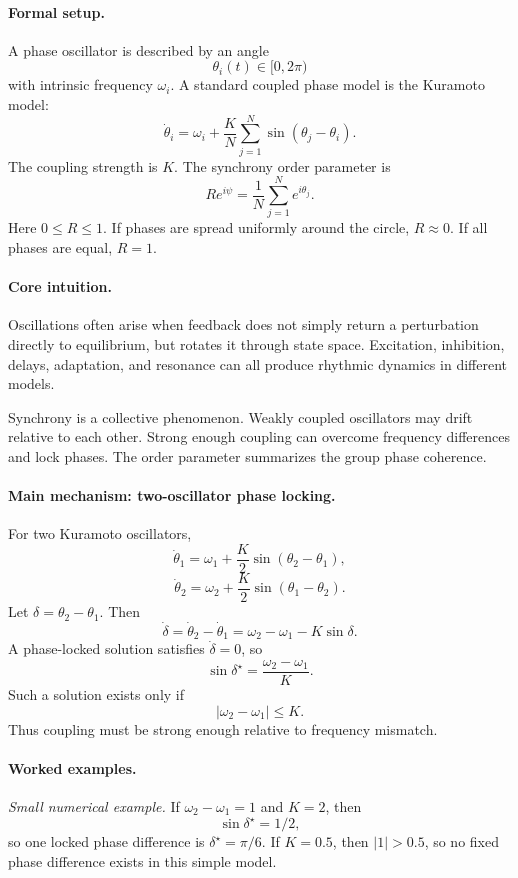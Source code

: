 \paragraph{Formal setup.}
A phase oscillator is described by an angle
\[
\theta_i(t)\in[0,2\pi)
\]
with intrinsic frequency \(\omega_i\). A standard coupled phase model is the Kuramoto model:
\[
\boxed{
\dot\theta_i=\omega_i+\frac{K}{N}\sum_{j=1}^N\sin(\theta_j-\theta_i).
}
\]
The coupling strength is \(K\). The synchrony order parameter is
\[
\boxed{
Re^{i\psi}=\frac1N\sum_{j=1}^N e^{i\theta_j}.
}
\]
Here \(0\leq R\leq1\). If phases are spread uniformly around the circle, \(R\approx0\). If all phases are equal, \(R=1\).

\paragraph{Core intuition.}
Oscillations often arise when feedback does not simply return a perturbation directly to equilibrium, but rotates it through state space. Excitation, inhibition, delays, adaptation, and resonance can all produce rhythmic dynamics in different models.

Synchrony is a collective phenomenon. Weakly coupled oscillators may drift relative to each other. Strong enough coupling can overcome frequency differences and lock phases. The order parameter summarizes the group phase coherence.

\paragraph{Main mechanism: two-oscillator phase locking.}
For two Kuramoto oscillators,
\[
\dot\theta_1=\omega_1+\frac K2\sin(\theta_2-\theta_1),
\]
\[
\dot\theta_2=\omega_2+\frac K2\sin(\theta_1-\theta_2).
\]
Let \(\delta=\theta_2-\theta_1\). Then
\[
\dot\delta
=\dot\theta_2-\dot\theta_1
=\omega_2-\omega_1-K\sin\delta.
\]
A phase-locked solution satisfies \(\dot\delta=0\), so
\[
\boxed{
\sin\delta^\star=\frac{\omega_2-\omega_1}{K}.
}
\]
Such a solution exists only if
\[
|\omega_2-\omega_1|\leq K.
\]
Thus coupling must be strong enough relative to frequency mismatch.

\paragraph{Worked examples.}
\emph{Small numerical example.}
If \(\omega_2-\omega_1=1\) and \(K=2\), then
\[
\sin\delta^\star=1/2,
\]
so one locked phase difference is \(\delta^\star=\pi/6\). If \(K=0.5\), then \(|1|>0.5\), so no fixed phase difference exists in this simple model.

